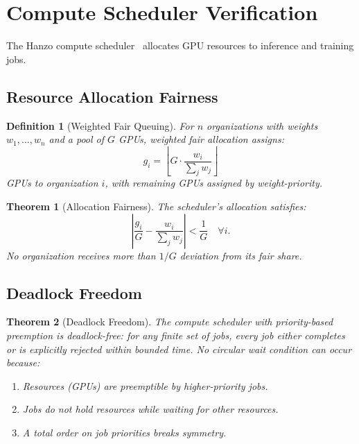 \documentclass[11pt]{article}
\newtheorem{theorem}{Theorem}
\newtheorem{definition}{Definition}
\begin{document}
\section{Compute Scheduler Verification}
\label{sec:compute}

The Hanzo compute scheduler~\cite{hanzoaci} allocates GPU resources to
inference and training jobs.

\subsection{Resource Allocation Fairness}

\begin{definition}[Weighted Fair Queuing]
For $n$ organizations with weights $w_1, \ldots, w_n$ and a pool of $G$ GPUs,
weighted fair allocation assigns:
\begin{equation}
g_i = \left\lfloor G \cdot \frac{w_i}{\sum_j w_j} \right\rfloor
\end{equation}
GPUs to organization $i$, with remaining GPUs assigned by weight-priority.
\end{definition}

\begin{theorem}[Allocation Fairness]
The scheduler's allocation satisfies:
\begin{equation}
\left| \frac{g_i}{G} - \frac{w_i}{\sum_j w_j} \right| < \frac{1}{G}
\quad \forall i.
\end{equation}
No organization receives more than $1/G$ deviation from its fair share.
\end{theorem}

\subsection{Deadlock Freedom}

\begin{theorem}[Deadlock Freedom]
The compute scheduler with priority-based preemption is deadlock-free: for
any finite set of jobs, every job either completes or is explicitly rejected
within bounded time. No circular wait condition can occur because:
\begin{enumerate}[leftmargin=1.4em]
    \item Resources (GPUs) are preemptible by higher-priority jobs.
    \item Jobs do not hold resources while waiting for other resources.
    \item A total order on job priorities breaks symmetry.
\end{enumerate}
\end{theorem}
\end{document}
